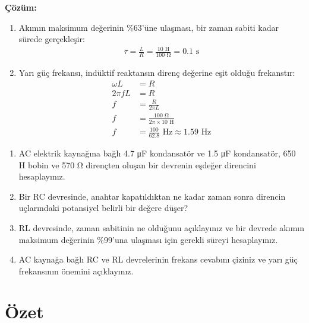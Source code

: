 \documentclass[11pt,letterpaper,twocolumn]{fenbil}
\begin{document}
\textbf{Çözüm:}
\begin{enumerate}
\item Akımın maksimum değerinin \%63'üne ulaşması, bir zaman sabiti kadar sürede gerçekleşir:
\begin{align}
\tau = \frac{L}{R} = \frac{10 \text{ H}}{100 \text{ Ω}} = 0.1 \text{ s}
\end{align}

\item Yarı güç frekansı, indüktif reaktansın direnç değerine eşit olduğu frekanstır:
\begin{align}
\omega L &= R\\
2\pi f L &= R\\
f &= \frac{R}{2\pi L}\\
f &= \frac{100 \text{ Ω}}{2\pi \times 10 \text{ H}}\\
f &= \frac{100}{62.8} \text{ Hz} \approx 1.59 \text{ Hz}
\end{align}
\end{enumerate}

\begin{tcolorbox}[title=SINAV İÇİN MUHTEMEL SORULAR]
\begin{enumerate}
\item AC elektrik kaynağına bağlı 4.7 μF kondansatör ve 1.5 μF kondansatör, 650 H bobin ve 570 Ω dirençten oluşan bir devrenin eşdeğer direncini hesaplayınız.

\item Bir RC devresinde, anahtar kapatıldıktan ne kadar zaman sonra direncin uçlarındaki potansiyel belirli bir değere düşer?

\item RL devresinde, zaman sabitinin ne olduğunu açıklayınız ve bir devrede akımın maksimum değerinin \%99'una ulaşması için gerekli süreyi hesaplayınız.

\item AC kaynağa bağlı RC ve RL devrelerinin frekans cevabını çiziniz ve yarı güç frekansının önemini açıklayınız.
\end{enumerate}
\end{tcolorbox}



\section{Özet}
\end{document}
